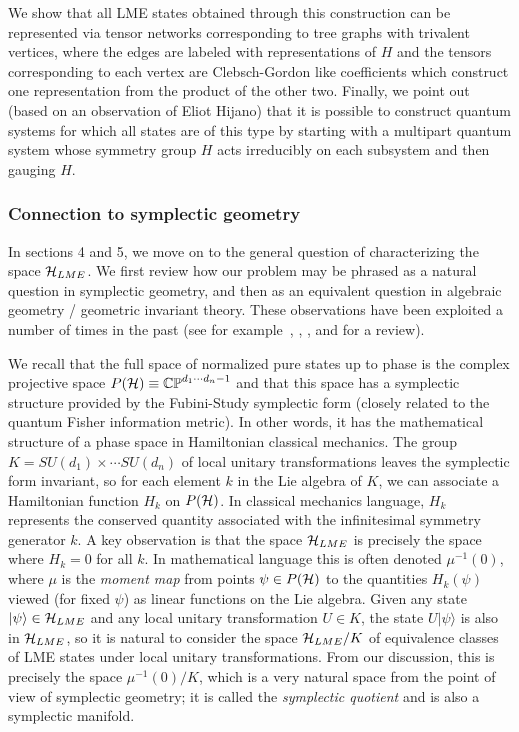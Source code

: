 \documentclass[12pt]{article}
\theoremstyle{definition}
\begin{document}
We show that all LME states obtained through this construction can be represented via tensor networks corresponding to tree graphs with trivalent vertices, where the edges are labeled with representations of $H$ and the tensors corresponding to each vertex are Clebsch-Gordon like coefficients which construct one representation from the product of the other two. Finally, we point out (based on an observation of Eliot Hijano) that it is possible to construct quantum systems for which all states are of this type by starting with a multipart quantum system whose symmetry group $H$ acts irreducibly on each subsystem and then gauging $H$.

\subsubsection*{Connection to symplectic geometry}

In sections 4 and 5, we move on to the general question of
characterizing the space ${\cal H}_{LME}$. We first review how our
problem may be phrased as a natural question in symplectic
geometry, and then as an equivalent question in algebraic geometry / geometric invariant theory. 
These observations have been exploited a number of times in the past (see for example~\cite{Kly02}, \cite[\S~3]{Kly07}, \cite[\S~4]{wallach}, and \cite{Walter} for a review).

We recall that the full space of normalized pure states up
to phase is the complex projective space $P({\cal H}) \equiv
\mathbb{CP}^{d_1 \cdots d_n -1}$ and that this space has a symplectic
structure provided by the Fubini-Study symplectic form (closely
related to the quantum Fisher information metric). In other words, it
has the mathematical structure of a phase space in Hamiltonian
classical mechanics.  The group $K = SU(d_1) \times \cdots SU(d_n)$ of
local unitary transformations leaves the symplectic form invariant, so
for each element $k$ in the Lie algebra of $K$, we can associate a
Hamiltonian function $H_k$ on $P({\cal H})$. In classical mechanics
language, $H_k$ represents the conserved quantity associated with the
infinitesimal symmetry generator $k$. A key observation is that the
space ${\cal H}_{LME}$ is precisely the space where $H_k = 0$ for all
$k$. In mathematical language this is often denoted $\mu^{-1}(0)$,
where $\mu$ is the {\it moment map} from points $\psi \in P({\cal H})$
to the quantities $H_k(\psi)$ viewed (for fixed $\psi$) as linear
functions on the Lie algebra. Given any state $|\psi \rangle \in {\cal
H}_{LME}$ and any local unitary transformation $U \in K$, the state $U
|\psi \rangle$ is also in ${\cal H}_{LME}$, so it is natural to
consider the space ${\cal H}_{LME}/K$ of equivalence classes of LME
states under local unitary transformations. From our discussion, this
is precisely the space $\mu^{-1}(0)/K$, which is a very natural space
from the point of view of symplectic geometry; it is called the
\emph{symplectic quotient} and is also a symplectic manifold.
\end{document}
